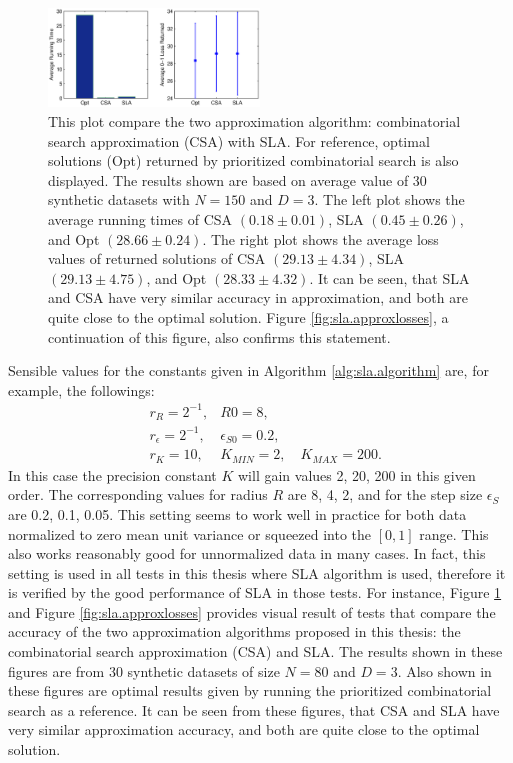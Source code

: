 \begin{figure}[here]
\includegraphics[width=0.50\textwidth]{images/fig54_approxsumm.eps}
\caption{
This plot compare the two approximation algorithm: combinatorial search approximation (CSA) with SLA. For reference, optimal solutions (Opt) returned by prioritized combinatorial search is also displayed. The results shown are based on average value of 30 synthetic datasets with $N=150$ and $D=3$. The left plot shows the average running times of CSA $(0.18 \pm 0.01)$, SLA $(0.45 \pm 0.26)$, and Opt $(28.66 \pm 0.24)$. The right plot shows the average loss values of returned solutions of CSA $(29.13 \pm 4.34)$, SLA $(29.13 \pm 4.75)$, and Opt $(28.33 \pm 4.32)$. It can be seen, that SLA and CSA have very similar accuracy in approximation, and both are quite close to the optimal solution. Figure \ref{fig:sla.approxlosses}, a continuation of this figure, also confirms this statement. 
}
\label{fig:sla.approxsumm}
\end{figure}

Sensible values for the constants given in Algorithm \ref{alg:sla.algorithm} are, for example, the followings:
\[ \begin{array} {lll}
& r_R = 2^{-1}, &R0 = 8, \\
& r_\epsilon = 2^{-1}, &\epsilon_{S0} = 0.2, \\
& r_K = 10, &K_{MIN} = 2, \quad K_{MAX} = 200.
\end{array} \] 
In this case the precision constant $K$ will gain values 2, 20, 200 in this given order. The corresponding values for radius $R$ are 8, 4, 2, and for the step size $\epsilon_S$ are 0.2, 0.1, 0.05. This setting seems to work well in practice for both data normalized to zero mean unit variance or squeezed into the $[0,1]$ range. This also works reasonably good for unnormalized data in many cases. In fact, this setting is used in all tests in this thesis where SLA algorithm is used, therefore it is verified by the good performance of SLA in those tests. For instance, Figure \ref{fig:sla.approxsumm} and Figure \ref{fig:sla.approxlosses} provides visual result of tests that compare the accuracy of the two approximation algorithms proposed in this thesis: the combinatorial search approximation (CSA) and SLA. The results shown in these figures are from 30 synthetic datasets of size $N=80$ and $D=3$. Also shown in these figures are optimal results given by running the prioritized combinatorial search as a reference. It can be seen from these figures, that CSA and SLA have very similar approximation accuracy, and both are quite close to the optimal solution. 



